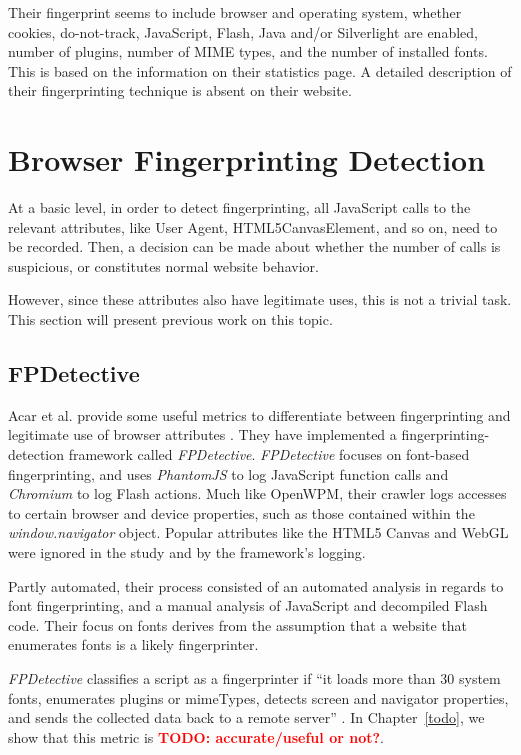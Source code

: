 \documentclass[
    fontsize=12pt,
    headings=small,
    parskip=half,
    bibliography=totoc,
    numbers=noenddot,
    open=any
    ]{scrreprt}
\newcommand{\todo}[1]{\textcolor{red}{\textbf{TODO: #1}}}
\begin{document}
Their fingerprint seems to include browser and operating system, whether cookies, do-not-track,
JavaScript, Flash, Java and/or Silverlight are enabled, number of plugins, number of MIME types,
and the number of installed fonts. This is based on the information on their statistics page.
A detailed description of their fingerprinting technique is absent on their website.

\section{Browser Fingerprinting Detection}
At a basic level, in order to detect fingerprinting, all JavaScript calls to the relevant attributes,
like User Agent, HTML5CanvasElement, and so on, need to be recorded. Then, a decision can be made about whether the number
of calls is suspicious, or constitutes normal website behavior.

However, since these attributes also have legitimate uses, this is not a trivial task.
This section will present previous work on this topic.


\subsection{FPDetective}
\label{related_work:fpdetective}
Acar et al. provide some useful metrics to differentiate between fingerprinting and legitimate use of
browser attributes \cite{DBLP:conf/ccs/AcarJNDGPP13}. They have implemented a fingerprinting-detection
framework called \textit{FPDetective}.
\textit{FPDetective} focuses on font-based fingerprinting, and uses
\textit{PhantomJS} to log JavaScript function calls and \textit{Chromium} to log Flash actions.
Much like OpenWPM, their crawler logs accesses to certain browser and device properties, such as
those contained within the \textit{window.navigator} object.
Popular attributes like the HTML5 Canvas and WebGL were ignored in the study and by the framework's logging.

Partly automated, their process consisted of an automated analysis in regards to font fingerprinting,
and a manual analysis of JavaScript and decompiled Flash code.
Their focus on fonts derives from the assumption that a website that
enumerates fonts is a likely fingerprinter.

\textit{FPDetective} classifies a script as a fingerprinter if ``it loads more than 30 system fonts, enumerates plugins
or mimeTypes, detects screen and navigator properties, and sends the collected data back to a remote server''
\cite{DBLP:conf/ccs/AcarJNDGPP13}.
In Chapter~\ref{todo}, we show that this metric is \todo{accurate/useful or not?}.
\end{document}
